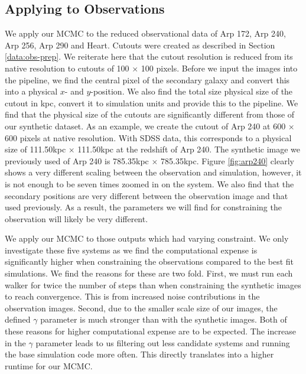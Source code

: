 \subsection{Applying to Observations}
\noindent We apply our MCMC to the reduced observational data of Arp 172, Arp 240, Arp 256, Arp 290 and Heart. Cutouts were created as described in Section \ref{data:obs-prep}. We reiterate here that the cutout resolution is reduced from its native resolution to cutouts of 100 $\times$ 100 pixels. Before we input the images into the pipeline, we find the central pixel of the secondary galaxy and convert this into a physical $x$- and $y$-position. We also find the total size physical size of the cutout in kpc, convert it to simulation units and provide this to the pipeline. We find that the physical size of the cutouts are significantly different from those of our synthetic dataset. As an example, we create the cutout of Arp 240 at 600 $\times$ 600 pixels at native resolution. With SDSS data, this corresponds to a physical size of 111.50kpc $\times$ 111.50kpc at the redshift of Arp 240. The synthetic image we previously used of Arp 240 is 785.35kpc $\times$ 785.35kpc. Figure \ref{fig:arp240} clearly shows a very different scaling between the observation and simulation, however, it is not enough to be seven times zoomed in on the system. We also find that the secondary positions are very different between the observation image and that used previously. As a result, the parameters we will find for constraining the observation will likely be very different. 

We apply our MCMC to those outputs which had varying constraint. We only investigate these five systems as we find the computational expense is significantly higher when constraining the observations compared to the best fit simulations. We find the reasons for these are two fold. First, we must run each walker for twice the number of steps than when constraining the synthetic images to reach convergence. This is from increased noise contributions in the observation images. Second, due to the smaller scale size of our images, the defined $\gamma$ parameter is much stronger than with the synthetic images. Both of these reasons for higher computational expense are to be expected. The increase in the $\gamma$ parameter leads to us filtering out less candidate systems and running the base simulation code more often. This directly translates into a higher runtime for our MCMC.

